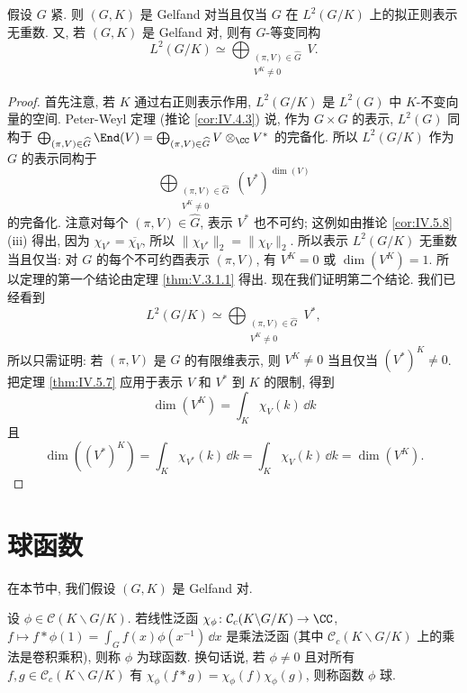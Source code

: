 \begin{theorem}[紧群情形]
\label{thm:V.3.2.4}
假设 $G$ 紧. 则 $(G, K)$ 是 Gelfand 对当且仅当 $G$ 在 $L^2(G/K)$ 上的拟正则表示无重数.
又, 若 $(G, K)$ 是 Gelfand 对, 则有 $G$-等变同构
\[
L^2(G/K) \simeq \bigoplus_{\substack{(\pi, V) \in \widehat{G}\\ V^K \neq 0}}V.
\]
\end{theorem}

\begin{proof}
首先注意, 若 $K$ 通过右正则表示作用, $L^2(G/K)$ 是 $L^2(G)$ 中 $K$-不变向量的空间. Peter-Weyl 定理 (推论 \ref{cor:IV.4.3}) 说, 作为 $G \times G$ 的表示, $L^2(G)$ 同构于 $\bigoplus_{(\pi, V) \in \widehat{G}}\End(V) = \bigoplus_{(\pi, V) \in \widehat{G}}V \otimes_{\CC}V^*$ 的完备化. 所以 $L^2(G/K)$ 作为 $G$ 的表示同构于
\[
\bigoplus_{\substack{(\pi, V) \in \widehat{G}\\ V^K \neq 0}}(V^*)^{\dim(V)}
\]
的完备化.
注意对每个 $(\pi, V) \in \widehat{G}$, 表示 $V^*$ 也不可约; 这例如由推论 \ref{cor:IV.5.8}(iii) 得出, 因为 $\chi_{V^*} = \overline{\chi_V}$, 所以 $\|\chi_{V^*}\|_2 = \|\chi_V\|_2$. 所以表示 $L^2(G/K)$ 无重数当且仅当: 对 $G$ 的每个不可约酉表示 $(\pi, V)$, 有 $V^K = 0$ 或 $\dim(V^K) = 1$. 所以定理的第一个结论由定理 \ref{thm:V.3.1.1} 得出.
现在我们证明第二个结论. 我们已经看到
\[
L^2(G/K) \simeq \bigoplus_{\substack{(\pi, V) \in \widehat{G}\\ V^K \neq 0}}V^*,
\]
所以只需证明: 若 $(\pi, V)$ 是 $G$ 的有限维表示, 则 $V^K \neq 0$ 当且仅当 $(V^*)^K \neq 0$. 把定理 \ref{thm:IV.5.7} 应用于表示 $V$ 和 $V^*$ 到 $K$ 的限制, 得到
\[
\dim(V^K) = \int_K\chi_V(k)\,\dd k
\]
且
\[
\dim((V^*)^K) = \int_K\chi_{V^*}(k)\,\dd k = \int_K\chi_V(k)\,\dd k = \dim(V^K).
\]
\end{proof}

\section{球函数}
在本节中, 我们假设 $(G, K)$ 是 Gelfand 对.

\begin{definition}
\label{def:V.4.1}
设 $\phi \in \mathcal{C}(K\backslash G/K)$. 若线性泛函 $\chi_{\phi} \colon \mathcal{C}_c(K\backslash G/K) \to \CC$, $f \longmapsto f * \phi(1) = \int_G f(x)\phi(x^{-1})\,\dd x$ 是乘法泛函 (其中 $\mathcal{C}_c(K\backslash G/K)$ 上的乘法是卷积乘积), 则称 $\phi$ 为球函数.
换句话说, 若 $\phi \neq 0$ 且对所有 $f, g \in \mathcal{C}_c(K\backslash G/K)$ 有 $\chi_{\phi}(f * g) = \chi_{\phi}(f)\chi_{\phi}(g)$, 则称函数 $\phi$ 球.
\end{definition}

